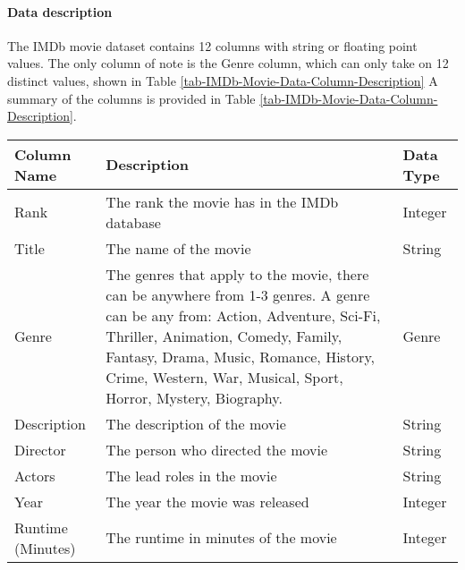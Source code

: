     \paragraph{Data description}
        The IMDb movie dataset contains 12 columns with string or floating point
            values. 
        The only column of note is the Genre column, which can only take on 12 distinct values, 
            shown in Table \ref*{tab-IMDb-Movie-Data-Column-Description}
        A summary of the columns is provided in Table \ref*{tab-IMDb-Movie-Data-Column-Description}.
        \begin{table}[h]
            \centering
            \begin{tabular}{lp{10cm}l}
                \toprule
                Column Name        & Description                                                                & Data Type \\
                \midrule
                Rank               & The rank the movie has in the IMDb database                                & Integer   \\
                Title              & The name of the movie                                                      & String    \\
                Genre              & The genres that apply to the movie, there can be anywhere from 1-3 genres.
                A genre can be any from: Action, Adventure, Sci-Fi, Thriller, Animation,
                    Comedy, Family, Fantasy, Drama, Music, Romance, History, Crime, Western, War,
                    Musical, Sport, Horror, Mystery, Biography.
                                   & Genre                                                                                  \\
                Description        & The description of the movie                                               & String    \\
                Director           & The person who directed the movie                                          & String    \\
                Actors             & The lead roles in the movie                                                & String    \\
                Year               & The year the movie was released                                            & Integer   \\
                Runtime (Minutes)  & The runtime in minutes of the movie                                        & Integer   \\

\end{tabular}
\end{table}
